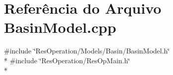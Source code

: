 \section{Referência do Arquivo Basin\+Model.\+cpp}
\label{_basin_model_8cpp}
{\ttfamily \#include \char`\"{}Res\+Operation/\+Models/\+Basin/\+Basin\+Model.\+h\char`\"{}}\\*
{\ttfamily \#include \char`\"{}Res\+Operation/\+Res\+Op\+Main.\+h\char`\"{}}\\*

